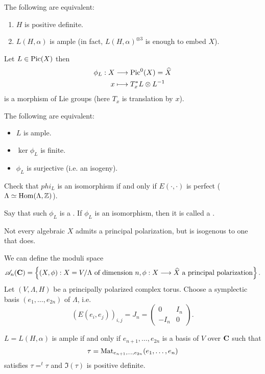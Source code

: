 \begin{theorem}[Lefschetz]
	The following are equivalent:
	\begin{enumerate}[1)]
		\item $H$ is positive definite.
		\item $L(H,\alpha)$ is ample (in fact, $L(H,\alpha)^{\otimes 3}$ is enough to embed $X$).
	\end{enumerate}
\end{theorem}
Let $L\in \operatorname{Pic}(X)$ then
\begin{align*}
	\phi_L: X &\longrightarrow \operatorname{Pic}^{0}(X) = \widehat{X} \\
	x &\longmapsto T_x^{*}L\otimes L^{-1}
\end{align*}
is a morphism of Lie groups (here $T_x$ is translation by $x$).

\begin{theorem}
	The following are equivalent:
	\begin{itemize}
		\item $L$ is ample.
		\item $\ker\phi_L$ is finite.
		\item $\phi_L$ is surjective (i.e. an isogeny).
	\end{itemize}
\end{theorem}
\begin{exercise}
	Check that $phi_L$ is an isomorphism if and only if $E(\cdot ,\cdot )$ is perfect ($\Lambda\simeq \operatorname{Hom}(\Lambda,\mathbb Z)$).
\end{exercise}
\begin{definition}
	Say that such $\phi_L$ is a . If $\phi_L$ is an isomorphism, then it is called a .
\end{definition}
\begin{remark}
	Not every algebraic $X$ admits a principal polarization, but is isogenous to one that does.
\end{remark}
We can define the moduli space
\[
	\CA_n(\bb{C}) = \left\{ (X,\phi):X = V /\Lambda\text{ of dimension }n,  \phi:X\to \wh{X}\text{ a principal polarization} \right\} 
.\] 
Let $(V,\Lambda,H)$ be a principally polarized complex torus. Choose a symplectic basis $(e_1,\dots,e_{2n})$ of $\Lambda$, i.e.
\[
	(E(e_i,e_j))_{i,j} = J_n = \begin{pmatrix} 0 & I_n \\ -I_n & 0 \end{pmatrix} 
.\] 
\begin{exercise}
	$L=L(H,\alpha)$ is ample if and only if $e_{n+1},\dots,e_{2n}$ is a basis of $V$ over $\mathbf{C}$ such that
	\[
	\tau = \operatorname{Mat}_{e_{n+1},\dots,e_{2n}}(e_1,\dots,e_n)
	\] 
	satisfies $\tau = ^{t}\tau$ and $\Im(\tau)$ is positive definite.
\end{exercise}
